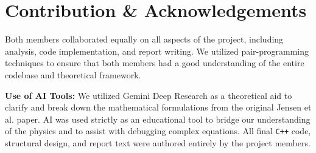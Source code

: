 \documentclass[sigconf,nonacm]{acmart}
\begin{document}
\section{Contribution \& Acknowledgements}

Both members collaborated equally on all aspects of the project, including analysis, code implementation, and report writing. We utilized pair-programming techniques to ensure that both members had a good understanding of the entire codebase and theoretical framework.

\textbf{Use of AI Tools:} We utilized Gemini Deep Research as a theoretical aid to clarify and break down the mathematical formulations from the original Jensen et al. paper. AI was used strictly as an educational tool to bridge our understanding of the physics and to assist with debugging complex equations. All final \texttt{C++} code, structural design, and report text were authored entirely by the project members.



\end{document}
